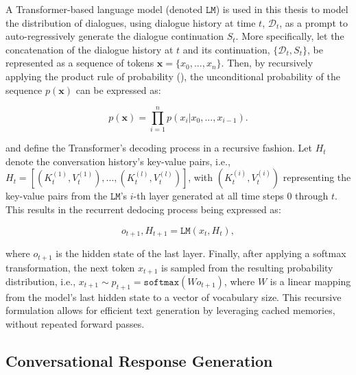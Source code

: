 A Transformer-based language model (denoted $\texttt{LM}$) is used in this thesis to model the distribution of dialogues, using dialogue history at time $t$, $\mathcal{D}_t$, as a prompt to auto-regressively generate the dialogue continuation $S_t$. More specifically, let the concatenation of the dialogue history at $t$ and its continuation, $\{\mathcal{D}_t, S_t\}$, be represented as a sequence of tokens $\textbf{x}= \{x_0, ..., x_n\}$. Then, by recursively applying the product rule of probability (\cite{bishop2006pattern}), the unconditional probability of the sequence $p(\textbf{x})$ can be expressed as:

\begin{equation}
    p(\textbf{x}) = \prod_{i = 1}^n p(x_i | x_0, ..., x_{i - 1}).
\end{equation}

\cite{dathathri2019plug} and \cite{madotto-etal-2020-plug} define the Transformer's decoding process in a recursive fashion. Let $H_t$ denote the conversation history's key-value pairs, i.e., $H_t = \left[ (K_t^{(1)}, V_t^{(1)}), ..., (K_t^{(l)}, V_t^{(l)}) \right]$, with $(K_t^{(i)}, V_t^{(i)})$ representing the key-value pairs from the $\texttt{LM}$'s $i$-th layer generated at all time steps $0$ through $t$. This results in the recurrent dedocing process being expressed as:

\begin{equation}
    o_{t + 1}, H_{t + 1} = \texttt{LM} \left( x_t, H_t \right),
\end{equation}

where $o_{t + 1}$ is the hidden state of the last layer. Finally, after applying a softmax transformation, the next token $x_{t + 1}$ is sampled from the resulting probability distribution, i.e.,  $x_{t + 1} \sim p_{t + 1} = \texttt{softmax} \left( W o_{t + 1} \right)$, where $W$ is a linear mapping from the model's last hidden state to a vector of vocabulary size. This recursive formulation allows for efficient text generation by leveraging cached memories, without repeated forward passes.


\subsection{Conversational Response Generation}

